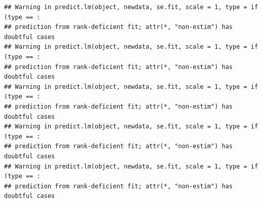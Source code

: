 \documentclass[
]{article}
\newenvironment{Shaded}{\begin{snugshade}}{\end{snugshade}}
\newcommand{\AttributeTok}[1]{\textcolor[rgb]{0.13,0.29,0.53}{#1}}
\newcommand{\ControlFlowTok}[1]{\textcolor[rgb]{0.13,0.29,0.53}{\textbf{#1}}}
\newcommand{\DecValTok}[1]{\textcolor[rgb]{0.00,0.00,0.81}{#1}}
\newcommand{\FloatTok}[1]{\textcolor[rgb]{0.00,0.00,0.81}{#1}}
\newcommand{\FunctionTok}[1]{\textcolor[rgb]{0.13,0.29,0.53}{\textbf{#1}}}
\newcommand{\NormalTok}[1]{#1}
\newcommand{\OtherTok}[1]{\textcolor[rgb]{0.56,0.35,0.01}{#1}}
\newcommand{\SpecialCharTok}[1]{\textcolor[rgb]{0.81,0.36,0.00}{\textbf{#1}}}
\newcommand{\StringTok}[1]{\textcolor[rgb]{0.31,0.60,0.02}{#1}}
\begin{document}
\begin{Shaded}
\end{Shaded}

\begin{verbatim}
## Warning in predict.lm(object, newdata, se.fit, scale = 1, type = if (type == :
## prediction from rank-deficient fit; attr(*, "non-estim") has doubtful cases
## Warning in predict.lm(object, newdata, se.fit, scale = 1, type = if (type == :
## prediction from rank-deficient fit; attr(*, "non-estim") has doubtful cases
## Warning in predict.lm(object, newdata, se.fit, scale = 1, type = if (type == :
## prediction from rank-deficient fit; attr(*, "non-estim") has doubtful cases
## Warning in predict.lm(object, newdata, se.fit, scale = 1, type = if (type == :
## prediction from rank-deficient fit; attr(*, "non-estim") has doubtful cases
## Warning in predict.lm(object, newdata, se.fit, scale = 1, type = if (type == :
## prediction from rank-deficient fit; attr(*, "non-estim") has doubtful cases
\end{verbatim}
\end{document}
